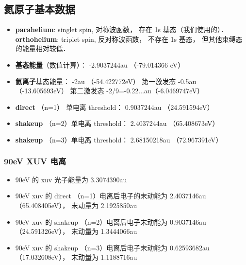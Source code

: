 

\subsection{氦原子基本数据}

\begin{itemize}
\item \textbf{parahelium}: singlet spin, 对称波函数， 存在 1s 基态（我们使用的）． \textbf{orthohelium}: triplet spin, 反对称波函数， 不存在 1s 基态， 但其他束缚态的能量相对较低．

\item \textbf{基态能量}（数值计算）： -2.9037244au （-79.014366 eV）

\item \textbf{氦离子}基态能量： -2au （-54.422772eV） 第一激发态 -0.5au （-13.605693eV） 第二激发态 -2/9=-0.22...au（-6.0469747eV）

\item \textbf{direct} （n=1） 单电离 threshold： 0.9037244au （24.591594eV）

\item \textbf{shakeup} （n=2）单电离 threshold： 2.4037244au （65.408673eV）

\item \textbf{shakeup} （n=3）单电离 threshold： 2.68150218au （72.967391eV）
\end{itemize}

\subsubsection{90eV XUV 电离}
\begin{itemize}
\item 90eV 的 xuv 光子能量为 3.3074390au

\item 90eV xuv 的 direct （n=1）电离后电子的末动能为 2.4037146au（65.408405eV）， 末动量为 2.1925850au

\item 90eV xuv 的 shakeup （n=2）电离后电子末动能为 0.9037146au （24.591326eV）， 末动量为 1.3444066au

\item 90eV xuv 的 shakeup （n=3）电离后电子末动能为 0.62593682au （17.032608eV）， 末动量为 1.1188716au
\end{itemize}


